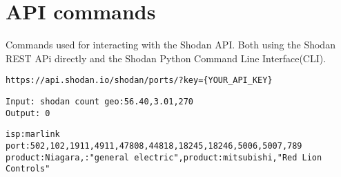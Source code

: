 \section{API commands}
Commands used for interacting with the Shodan API. Both using the Shodan REST APi directly \cite{api_ref} and the Shodan Python Command Line Interface(CLI)\cite{cli_ref}.

\begin{lstlisting}[label=lst:api_ports,caption=Ports web API call]
https://api.shodan.io/shodan/ports/?key={YOUR_API_KEY}
\end{lstlisting}

\begin{lstlisting}[label=lst:geolocation_sea,caption=Check for devices in the North Sea using command line ]
Input: shodan count geo:56.40,3.01,270
Output: 0
\end{lstlisting}


\begin{lstlisting}
isp:marlink port:502,102,1911,4911,47808,44818,18245,18246,5006,5007,789 product:Niagara,:"general electric",product:mitsubishi,"Red Lion Controls"
\end{lstlisting}
